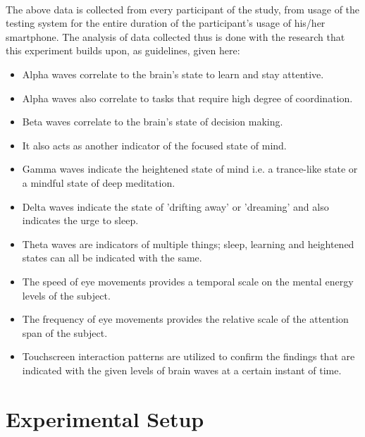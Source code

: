 \documentclass{article}
\begin{document}
\paragraph{}The above data is collected from every participant of the study, from usage of the testing system for the entire duration of the participant's usage of his/her smartphone. The analysis of data collected thus is done with the research that this experiment builds upon, as guidelines\cite{buzsaki2006rhythms}, given here:

\begin{itemize}
    \item Alpha waves correlate to the brain's state to learn and stay attentive.
    \item Alpha waves also correlate to tasks that require high degree of coordination.
    \item Beta waves correlate to the brain's state of decision making.
    \item It also acts as another indicator of the focused state of mind.
    \item Gamma waves indicate the heightened state of mind i.e. a trance-like state or a mindful state of deep meditation.
    \item Delta waves indicate the state of 'drifting away' or 'dreaming' and also indicates the urge to sleep.
    \item Theta waves are indicators of multiple things; sleep, learning and heightened states can all be indicated with the same.
    \item The speed of eye movements provides a temporal scale on the mental energy levels of the subject.
    \item The frequency of eye movements provides the relative scale of the attention span of the subject.
    \item Touchscreen interaction patterns are utilized to confirm the findings that are indicated with the given levels of brain waves at a certain instant of time.
\end{itemize}

\section{Experimental Setup}
\end{document}
